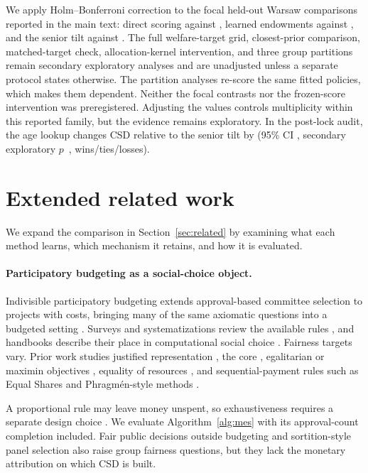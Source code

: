 We apply Holm--Bonferroni correction to the \WarsawHolmFamilyN{} focal held-out
Warsaw comparisons reported in the main text: direct scoring against \MES{},
learned endowments against \MES{}, and the senior tilt against \MES{}. The full
welfare-target grid, closest-prior comparison, matched-target check,
allocation-kernel intervention, and three group partitions remain secondary
exploratory analyses and are unadjusted unless a separate protocol states
otherwise. The partition analyses re-score the same fitted policies, which
makes them dependent. Neither the focal contrasts nor the frozen-score
intervention was preregistered. Adjusting the values controls multiplicity
within this reported family, but the evidence remains exploratory.
In the post-lock audit, the age lookup changes CSD relative to the senior tilt
by \AgeLookupVsSeniorDiff{} (95\% CI \AgeLookupVsSeniorCI, secondary exploratory
$p$~\AgeLookupVsSeniorP, \AgeLookupVsSeniorRecord{} wins/ties/losses).

\section{Extended related work}
\label{app:related}

We expand the comparison in Section~\ref{sec:related} by examining what each
method learns, which mechanism it retains, and how it is evaluated.

\paragraph{Participatory budgeting as a social-choice object.}
Indivisible participatory budgeting extends approval-based committee selection
to projects with costs, bringing many of the same axiomatic questions into a
budgeted setting \citep{aziz2018pbaxioms,talmon2019framework}. Surveys and
systematizations review the available rules
\citep{rey2025survey,los2022systematization}, and handbooks describe their
place in computational social choice
\citep{brandt2016handbook,lackner2022book}. Fairness targets vary.
Prior work studies justified representation
\citep{aziz2015jr,peters2022additive}, the core \citep{fain2016core},
egalitarian or maximin objectives \citep{sreedurga2022maxmin}, equality of
resources \citep{maly2023equality}, and sequential-payment rules such as Equal
Shares and Phragm\'en-style methods
\citep{peters2020welfarism,brill2024phragmen}.

A proportional rule may leave money unspent, so exhaustiveness requires a
separate design choice \citep{papasotiropoulos2025bos}. We evaluate
Algorithm~\ref{alg:mes} with its approval-count completion included. Fair
public decisions outside budgeting \citep{conitzer2017fair} and
sortition-style panel selection \citep{flanigan2021assemblies} also raise group
fairness questions, but they lack the monetary attribution on which CSD is
built.

